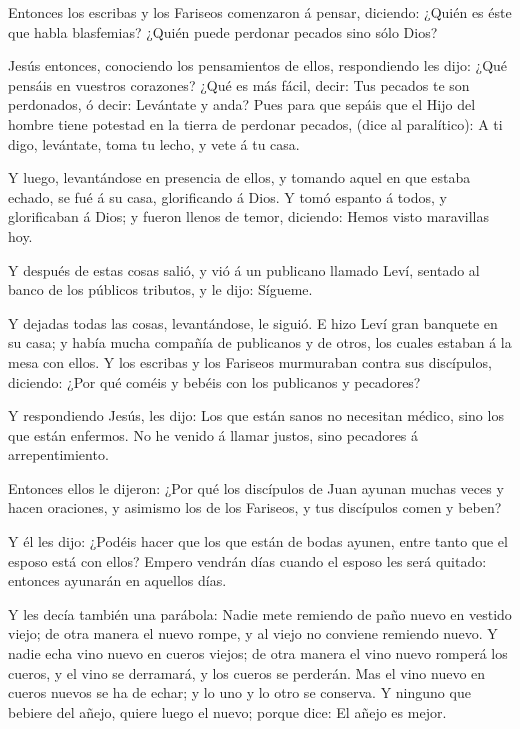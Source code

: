  Entonces los escribas y los Fariseos comenzaron á pensar,
diciendo: ¿Quién es éste que habla blasfemias? ¿Quién puede perdonar
pecados sino sólo Dios?

 Jesús entonces, conociendo los pensamientos de ellos,
respondiendo les dijo: ¿Qué pensáis en vuestros corazones? 
¿Qué es más fácil, decir: Tus pecados te son perdonados, ó decir:
Levántate y anda?  Pues para que sepáis que el Hijo del
hombre tiene potestad en la tierra de perdonar pecados, (dice al
paralítico): A ti digo, levántate, toma tu lecho, y vete á tu casa.

 Y luego, levantándose en presencia de ellos, y tomando
aquel en que estaba echado, se fué á su casa, glorificando á Dios.
 Y tomó espanto á todos, y glorificaban á Dios; y fueron
llenos de temor, diciendo: Hemos visto maravillas hoy.

 Y después de estas cosas salió, y vió á un publicano
llamado Leví, sentado al banco de los públicos tributos, y le dijo:
Sígueme.

 Y dejadas todas las cosas, levantándose, le siguió.
 E hizo Leví gran banquete en su casa; y había mucha
compañía de publicanos y de otros, los cuales estaban á la mesa con
ellos.  Y los escribas y los Fariseos murmuraban contra sus
discípulos, diciendo: ¿Por qué coméis y bebéis con los publicanos y
pecadores?

 Y respondiendo Jesús, les dijo: Los que están sanos no
necesitan médico, sino los que están enfermos.  No he
venido á llamar justos, sino pecadores á arrepentimiento.

 Entonces ellos le dijeron: ¿Por qué los discípulos de Juan
ayunan muchas veces y hacen oraciones, y asimismo los de los Fariseos, y
tus discípulos comen y beben?

 Y él les dijo: ¿Podéis hacer que los que están de bodas
ayunen, entre tanto que el esposo está con ellos?  Empero
vendrán días cuando el esposo les será quitado: entonces ayunarán en
aquellos días.

 Y les decía también una parábola: Nadie mete remiendo de
paño nuevo en vestido viejo; de otra manera el nuevo rompe, y al viejo
no conviene remiendo nuevo.  Y nadie echa vino nuevo en
cueros viejos; de otra manera el vino nuevo romperá los cueros, y el
vino se derramará, y los cueros se perderán.  Mas el vino
nuevo en cueros nuevos se ha de echar; y lo uno y lo otro se conserva.
 Y ninguno que bebiere del añejo, quiere luego el nuevo;
porque dice: El añejo es mejor.

